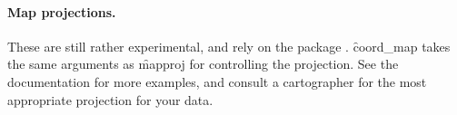 % 
%


\paragraph{Map projections.}  These are still rather experimental, and rely on the  package \citep{mapproj}.  \f{coord_map} takes the same arguments as \f{mapproj} for controlling the projection.  See the documentation for more examples, and consult a cartographer for the most appropriate projection for your data.


